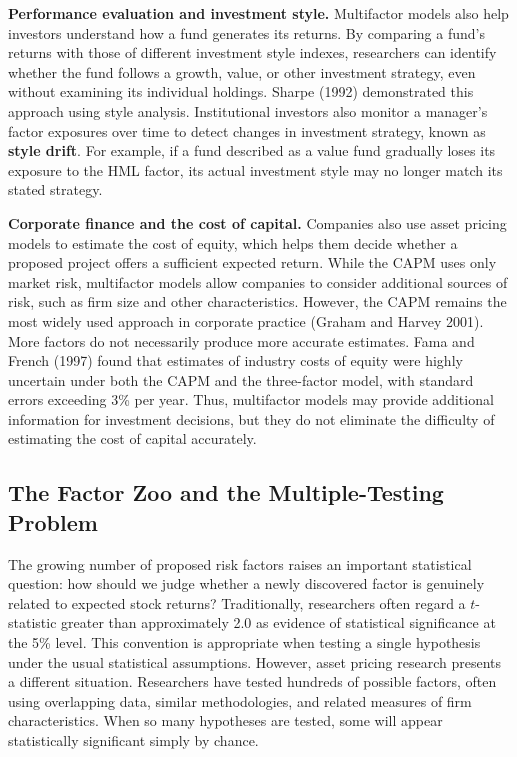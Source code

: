 \textbf{Performance evaluation and investment style.}
Multifactor models also help investors understand how a fund
generates its returns. By comparing a fund's returns with those
of different investment style indexes, researchers can identify
whether the fund follows a growth, value, or other investment
strategy, even without examining its individual holdings.
Sharpe (1992) demonstrated this approach using style analysis.
Institutional investors also monitor a manager's factor exposures
over time to detect changes in investment strategy, known as
\textbf{style drift}. For example, if a
fund described as a value fund gradually loses its exposure to
the HML factor, its actual investment style may no longer match
its stated strategy.

\textbf{Corporate finance and the cost of capital.}
Companies also use asset pricing models to estimate the cost of
equity, which helps them decide whether a proposed project offers
a sufficient expected return. While the CAPM uses only market
risk, multifactor models allow companies to consider additional
sources of risk, such as firm size and other characteristics.
However, the CAPM remains the most widely used approach in
corporate practice (Graham and Harvey 2001). More factors do not
necessarily produce more accurate estimates. Fama and French
(1997) found that estimates of industry costs of equity were
highly uncertain under both the CAPM and the three-factor model,
with standard errors exceeding 3\% per year. Thus, multifactor
models may provide additional information for investment
decisions, but they do not eliminate the difficulty of estimating
the cost of capital accurately.


\subsection{The Factor Zoo and the Multiple-Testing Problem}
\label{sec:03-multiple-testing}

The growing number of proposed risk factors raises an important
statistical question: how should we judge whether a newly discovered
factor is genuinely related to expected stock returns? Traditionally,
researchers often regard a $t$-statistic greater than approximately
2.0 as evidence of statistical significance at the 5\% level. This
convention is appropriate when testing a single hypothesis under the
usual statistical assumptions. However, asset pricing research
presents a different situation. Researchers have tested hundreds
of possible factors, often using overlapping data, similar
methodologies, and related measures of firm characteristics. When
so many hypotheses are tested, some will appear statistically
significant simply by chance.

